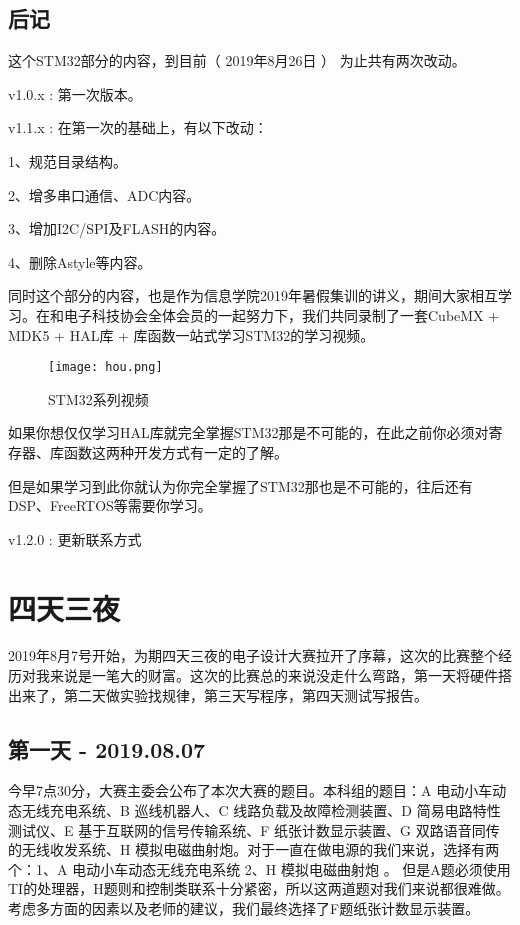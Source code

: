 \documentclass[cn,11pt]{elegantbook}
\begin{document}
\section{后记}

这个STM32部分的内容，到目前（  2019年8月26日 ） 为止共有两次改动。

v1.0.x : 第一次版本。

v1.1.x : 在第一次的基础上，有以下改动：

1、规范目录结构。

2、增多串口通信、ADC内容。

3、增加I2C/SPI及FLASH的内容。

4、删除Astyle等内容。

同时这个部分的内容，也是作为信息学院2019年暑假集训的讲义，期间大家相互学习。在和电子科技协会全体会员的一起努力下，我们共同录制了一套CubeMX + MDK5 + HAL库 + 库函数一站式学习STM32的学习视频。
	
\begin{figure}[htbp]
	\centering
	\texttt{[image: hou.png]}
	\caption{ STM32系列视频 \label{fig:scatter}}
\end{figure}

如果你想仅仅学习HAL库就完全掌握STM32那是不可能的，在此之前你必须对寄存器、库函数这两种开发方式有一定的了解。

但是如果学习到此你就认为你完全掌握了STM32那也是不可能的，往后还有DSP、FreeRTOS等需要你学习。

v1.2.0 : 更新联系方式

\chapter{四天三夜}

2019年8月7号开始，为期四天三夜的电子设计大赛拉开了序幕，这次的比赛整个经历对我来说是一笔大的财富。这次的比赛总的来说没走什么弯路，第一天将硬件搭出来了，第二天做实验找规律，第三天写程序，第四天测试写报告。

\section{第一天 - 2019.08.07}
今早7点30分，大赛主委会公布了本次大赛的题目。本科组的题目：A 电动小车动态无线充电系统、B	巡线机器人、C	线路负载及故障检测装置、D	简易电路特性测试仪、E	基于互联网的信号传输系统、F	纸张计数显示装置、G	双路语音同传的无线收发系统、H	模拟电磁曲射炮。对于一直在做电源的我们来说，选择有两个：1、A 电动小车动态无线充电系统 2、H	模拟电磁曲射炮 。 但是A题必须使用TI的处理器，H题则和控制类联系十分紧密，所以这两道题对我们来说都很难做。考虑多方面的因素以及老师的建议，我们最终选择了F题纸张计数显示装置。
\end{document}
